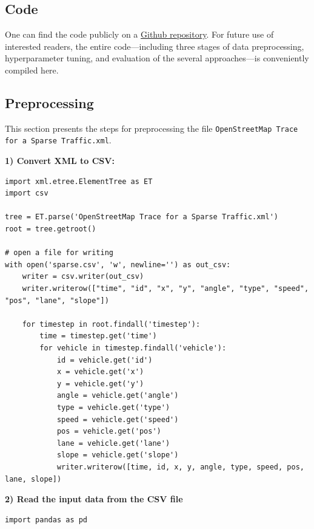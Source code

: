 \documentclass[journal,onecolumn]{IEEEtran}
\begin{document}
{\begin{appendices}
\clearpage
\section{Code} \label{appendix-code}
One can find the code publicly on a \href{https://github.com/sinaebrahimi/Location_Prediction_-ANN-7088CEM-Project-}{Github repository}. For future use of interested readers, the entire code—including three stages of data preprocessing, hyperparameter tuning, and evaluation of the several approaches—is conveniently compiled here.

\subsection{Preprocessing}\label{preprocessing}
This section presents the steps for preprocessing the file \texttt{OpenStreetMap Trace for a Sparse Traffic.xml}.

\textbf{1) Convert XML to CSV:}
\begin{verbatim}
import xml.etree.ElementTree as ET
import csv

tree = ET.parse('OpenStreetMap Trace for a Sparse Traffic.xml')
root = tree.getroot()

# open a file for writing
with open('sparse.csv', 'w', newline='') as out_csv:
    writer = csv.writer(out_csv)
    writer.writerow(["time", "id", "x", "y", "angle", "type", "speed", "pos", "lane", "slope"])
    
    for timestep in root.findall('timestep'):
        time = timestep.get('time')
        for vehicle in timestep.findall('vehicle'):
            id = vehicle.get('id')
            x = vehicle.get('x')
            y = vehicle.get('y')
            angle = vehicle.get('angle')
            type = vehicle.get('type')
            speed = vehicle.get('speed')
            pos = vehicle.get('pos')
            lane = vehicle.get('lane')
            slope = vehicle.get('slope')
            writer.writerow([time, id, x, y, angle, type, speed, pos, lane, slope])
\end{verbatim}

\textbf{2) Read the input data from the CSV file}
\begin{verbatim}
import pandas as pd


\end{verbatim}
\end{appendices}}
\end{document}
